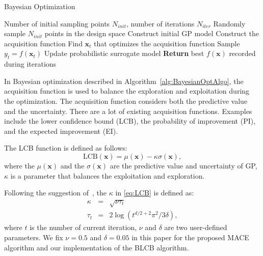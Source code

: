 \begin{algorithm}
    \caption{Bayesian Optimization}
    \label{alg:BayesianOptAlgo}
    \begin{algorithmic}[1]
        \REQUIRE Number of initial sampling points $N_{init}$, number of iterations $N_{iter}$
        \STATE Randomly sample $N_{init}$ points in the design space
        \STATE Construct initial GP model
        \STATE Construct the acquisition function
        \STATE Find $\bm{x}_t$ that optimizes the acquisition function
        \STATE Sample $y_t = f(\bm{x}_t)$
        \STATE Update probabilistic surrogate model
        \ENDFOR
        \STATE \textbf{Return} best $f(\bm{x})$ recorded during iterations
    \end{algorithmic}
\end{algorithm}

In Bayesian optimization described in Algorithm~\ref{alg:BayesianOptAlgo}, the acquisition function is used to balance the exploration and exploitation during the optimization. The acquisition function considers both the predictive value and the uncertainty. There are a lot of existing acquisition functions. Examples include the lower confidence bound (LCB), the probability of improvement (PI), and the expected improvement (EI).

The LCB function is defined as follows:
\begin{equation}
    \label{eq:LCB}
    \mathrm{LCB}(\bm{x}) = \mu(\bm{x}) - \kappa \sigma(\bm{x}),
\end{equation}
where the $\mu(\bm{x})$ and the $\sigma(\bm{x})$ are the predictive value and uncertainty of GP, $\kappa$ is a parameter that balances the exploitation and exploration.

Following the suggestion of~\cite{brochu2010tutorial}, the $\kappa$ in \eqref{eq:LCB} is defined as:
\begin{equation}
    \label{eq:LCBKappa}
    \begin{array}{lll}
        \kappa &=& \sqrt{\nu \tau_t} \\
        \tau_t &=& 2 \log(t^{d/2+2} \pi^2 / 3 \delta),
    \end{array}
\end{equation}
where $t$ is the number of current iteration, $\nu$ and $\delta$ are two user-defined parameters. We fix $\nu = 0.5$ and $\delta = 0.05$ in this paper for the proposed MACE algorithm and our implementation of the BLCB algorithm.

